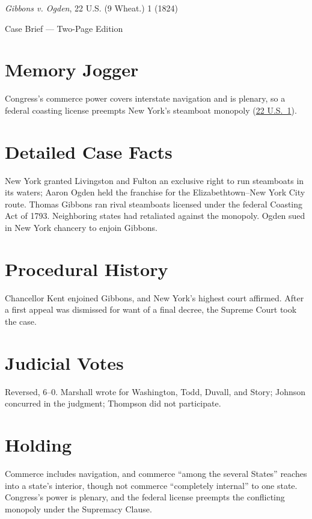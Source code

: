 \documentclass[12pt]{article}
\begin{document}
\begin{center}
{\LARGE \textit{Gibbons v. Ogden}, 22 U.S. (9 Wheat.) 1 (1824)\par}
\vspace{0.5em}
{\large Case Brief --- Two-Page Edition\par}
\end{center}

\section{Memory Jogger}
Congress's commerce power covers interstate navigation and is plenary, so a federal coasting license preempts New York's steamboat monopoly (\href{https://www.courtlistener.com/opinion/85412/gibbons-v-ogden/}{22 U.S.\ 1}).

\section{Detailed Case Facts}
New York granted Livingston and Fulton an exclusive right to run steamboats in its waters; Aaron Ogden held the franchise for the Elizabethtown--New York City route. Thomas Gibbons ran rival steamboats licensed under the federal Coasting Act of 1793. Neighboring states had retaliated against the monopoly. Ogden sued in New York chancery to enjoin Gibbons.

\section{Procedural History}
Chancellor Kent enjoined Gibbons, and New York's highest court affirmed. After a first appeal was dismissed for want of a final decree, the Supreme Court took the case.

\section{Judicial Votes}
Reversed, 6--0. Marshall wrote for Washington, Todd, Duvall, and Story; Johnson concurred in the judgment; Thompson did not participate.

\section{Holding}
Commerce includes navigation, and commerce ``among the several States'' reaches into a state's interior, though not commerce ``completely internal'' to one state. Congress's power is plenary, and the federal license preempts the conflicting monopoly under the Supremacy Clause.
\end{document}
